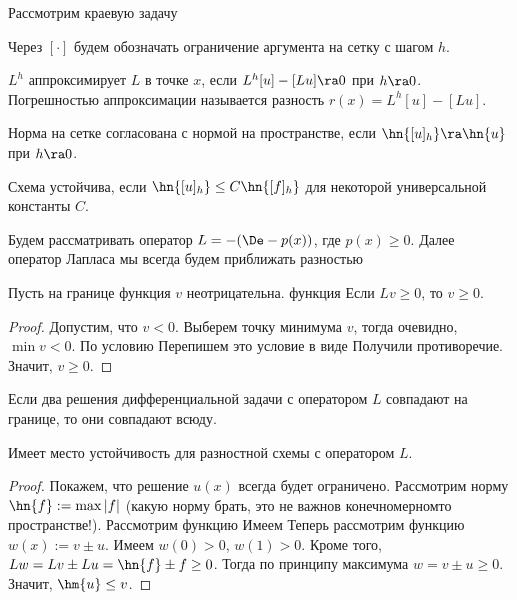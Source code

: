 \documentclass[a4paper]{article}
\begin{document}
Рассмотрим краевую задачу

Через $[\cdot]$ будем обозначать ограничение аргумента на сетку с шагом $h$.

\begin{df}
$L^h$ аппроксимирует $L$ в точке $x$, если $L^h[u]- [Lu]\ra 0$ при $h\ra 0$.
Погрешностью аппроксимации называется разность $r(x) = L^h[u]-[Lu]$.
\end{df}

\begin{df}
Норма на сетке согласована с нормой на пространстве, если $\hn{[u]_h} \ra \hn{u}$ при $h\ra 0$.
\end{df}

\begin{df}
Схема устойчива, если $\hn{[u]_h} \le C \hn{[f]_h}$ для некоторой универсальной константы $C$.
\end{df}

Будем рассматривать оператор $L = -(\De - p(x))$, где  $p(x) \ge 0$.
Далее оператор Лапласа мы всегда будем приближать разностью


\begin{theorem}
Пусть на границе функция $v$ неотрицательна. функция Если ${L v\ge 0}$, то $v\ge 0$.
\end{theorem}
\begin{proof}
Допустим, что $v < 0$. Выберем точку минимума $v$, тогда очевидно, $\min v < 0$.
По условию
Перепишем это условие в виде
Получили противоречие. Значит, $v \ge 0$.
\end{proof}

\begin{imp}
Если два решения дифференциальной задачи с оператором $L$ совпадают на границе, то они совпадают всюду.
\end{imp}


\begin{stm}
Имеет место устойчивость для разностной схемы с оператором $L$.
\end{stm}
\begin{proof}
Покажем, что решение $u(x)$ всегда будет ограничено.
Рассмотрим норму $\hn{f} := \max |f|$ (какую норму брать, это не важно\т в конечномерном\д то пространстве!).
Рассмотрим функцию
Имеем
Теперь рассмотрим функцию $w(x):= v \pm u$.
Имеем $w(0) > 0$, $w(1) > 0$. Кроме того, $L w = L v \pm L u = \hn{f} \pm f \ge 0$.
Тогда по принципу максимума $w = v \pm u \ge 0$. Значит, $\hm{u}\le v$.
\end{proof}
\end{document}
